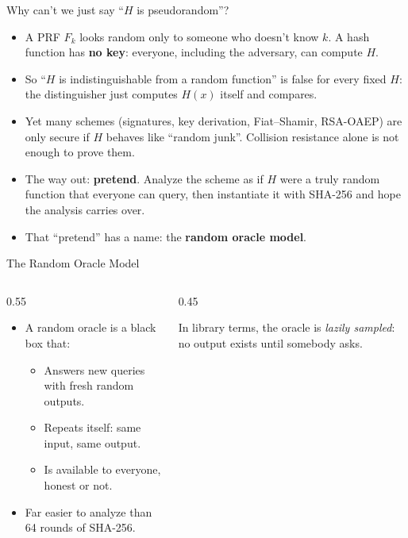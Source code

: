\ifdefined\PRESENTATION\else\PassOptionsToClass{handout}{beamer}\fi\documentclass[aspectratio=169, lualatex]{beamer}
\begin{document}
\begin{frame}{Why can't we just say ``$H$ is pseudorandom''?}
	\begin{itemize}
		\item A PRF $F_k$ looks random only to someone who doesn't know $k$. A hash function has \textbf{no key}: everyone, including the adversary, can compute $H$.
		\item So ``$H$ is indistinguishable from a random function'' is false for every fixed $H$: the distinguisher just computes $H(x)$ itself and compares.
		\item Yet many schemes (signatures, key derivation, Fiat--Shamir, RSA-OAEP) are only secure if $H$ behaves like ``random junk''. Collision resistance alone is not enough to prove them.
		\item The way out: \textbf{pretend}. Analyze the scheme as if $H$ were a truly random function that everyone can query, then instantiate it with SHA-256 and hope the analysis carries over.
		\item That ``pretend'' has a name: the \textbf{random oracle model}.
	\end{itemize}
\end{frame}

\begin{frame}{The Random Oracle Model}
	\begin{columns}[c]
		\begin{column}{0.55\textwidth}
			\begin{itemize}
				\item A random oracle is a black box that:
				      \begin{itemize}
					      \item Answers new queries with fresh random outputs.
					      \item Repeats itself: same input, same output.
					      \item Is available to everyone, honest or not.
				      \end{itemize}
				\item Far easier to analyze than 64 rounds of SHA-256.
			\end{itemize}
		\end{column}
		\begin{column}{0.45\textwidth}
			\begin{center}
			\end{center}
			\small In library terms, the oracle is \emph{lazily sampled}: no output exists until somebody asks.
		\end{column}
	\end{columns}
\end{frame}
\end{document}
